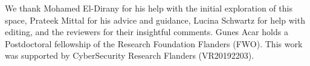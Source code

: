 We thank Mohamed El-Dirany for his help with the initial exploration of this space, Prateek Mittal for his advice and guidance, Lucina Schwartz for help with editing, and the reviewers for their insightful comments.
Gunes Acar holds a Postdoctoral fellowship of the Research Foundation Flanders (FWO). This work was supported by CyberSecurity Research Flanders (VR20192203).